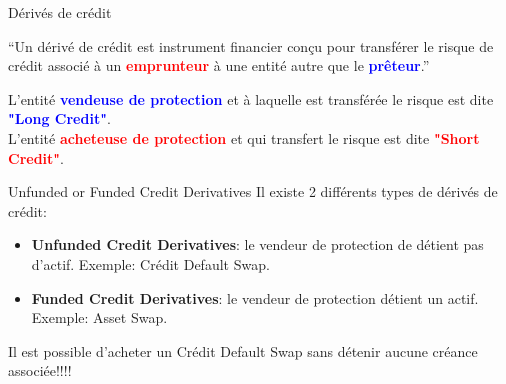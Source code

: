 \documentclass{beamer}
\begin{document}
\begin{frame}{Dérivés de crédit}
\begin{exampleblock}{}
  {\large ``Un dérivé de crédit est instrument financier conçu pour transférer le risque de crédit associé à un \textcolor{red}{\textbf{emprunteur}} à une entité autre que le \textcolor{blue}{\textbf{prêteur}}.''}
\end{exampleblock}
\vspace{0.5cm}
L'entité \textcolor{blue}{\textbf{vendeuse de protection}} et à laquelle est transférée le risque est dite \textcolor{blue}{\textbf{"Long Credit"}}.\\
\vspace{0.5cm}
L'entité \textcolor{red}{\textbf{acheteuse de protection}} et qui transfert le risque est dite \textcolor{red}{\textbf{"Short Credit"}}.\\
\end{frame}

\begin{frame}{Unfunded or Funded Credit Derivatives}
Il existe 2 différents types de dérivés de crédit:
\vspace{0.5cm}
\begin{itemize}
\item {}\textbf{Unfunded Credit Derivatives}: le vendeur de protection de détient pas d'actif. Exemple: Crédit Default Swap.
\item {}\textbf{Funded Credit Derivatives}: le vendeur de protection détient un actif. Exemple: Asset Swap.
\end{itemize}
\vspace{0.5cm}
Il est possible d'acheter un Crédit Default Swap sans détenir aucune créance associée!!!!
\end{frame}
\end{document}
